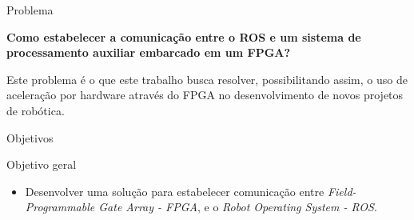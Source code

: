 \documentclass[10pt]{beamer}
\begin{document}
\begin{frame}[fragile]{Problema}
	\begin{center}
		\textbf{Como estabelecer a comunicação entre o ROS e um sistema de processamento auxiliar embarcado em um FPGA? }
	\end{center}
	\vspace{0.75cm}
	\begin{justify}
		Este problema é o que este trabalho busca resolver, possibilitando assim, o uso de aceleração por hardware através do FPGA no desenvolvimento de novos projetos de robótica.
	\end{justify}
\end{frame}


\begin{frame}{Objetivos}
    \begin{alertblock}{Objetivo geral}
		\vspace{0.25cm}
    	\begin{itemize}
    	\item Desenvolver uma solução para estabelecer comunicação entre \textit{Field-Programmable Gate Array - FPGA}, e o \textit{Robot Operating System - ROS}.
    	\end{itemize}
    \end{alertblock}
\end{frame}
\end{document}

